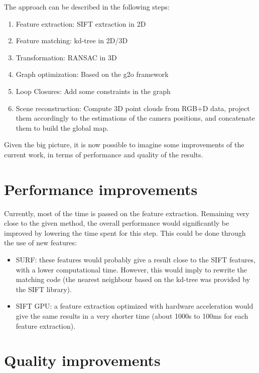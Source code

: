 The approach can be described in the following steps:
\begin{enumerate}
\item Feature extraction: SIFT extraction in 2D
\item Feature matching: kd-tree in 2D/3D
\item Transformation: RANSAC in 3D
\item Graph optimization: Based on the g2o framework
\item Loop Closures: Add some constraints in the graph
\item Scene reconstruction: Compute 3D point clouds from RGB+D data, project them accordingly to the estimations of the camera positions, and concatenate them to build the global map.
\end{enumerate}

Given the big picture, it is now possible to imagine some improvements of the current work, in terms of performance and quality of the results.

\section{Performance improvements}

Currently, most of the time is passed on the feature extraction. Remaining very close to the given method, the overall performance would significantly be improved by lowering the time spent for this step. This could be done through the use of new features:
\begin{itemize}
\item SURF: these features would probably give a result close to the SIFT features, with a lower computational time. However, this would imply to rewrite the matching code (the nearest neighbour based on the kd-tree was provided by the SIFT library).
\item SIFT GPU: a feature extraction optimized with hardware acceleration would give the same results in a very shorter time (about 1000s to 100ms for each feature extraction).
\end{itemize}

\section{Quality improvements}

